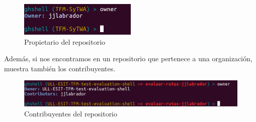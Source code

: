 \begin{itemize}
		\begin{figure}[H]
		\begin{center}
		\includegraphics[width=0.5\textwidth]{images/owner1-1}
		\caption{Propietario del repositorio}
		\label{fig:owner1-1}
		\end{center}
		\end{figure}
		
		Además, si nos encontramos en un repositorio que pertenece a una organización, muestra también los contribuyentes.
		
		\begin{figure}[H]
		\begin{center}
		\includegraphics[width=1\textwidth]{images/owner1-2}
		\caption{Contribuyentes del repositorio}
		\label{fig:owner1-2}
		\end{center}
		\end{figure}
	
\end{itemize}



